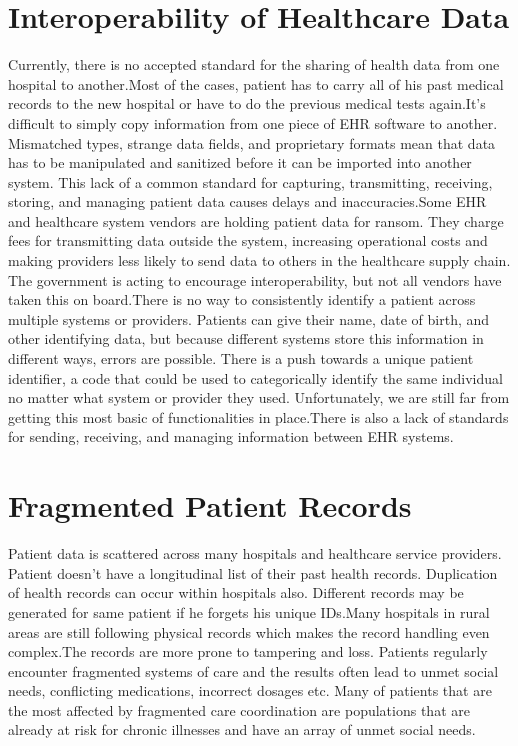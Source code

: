 \documentclass[12pt]{report}
\begin{document}
\section{Interoperability of Healthcare Data}
\frenchspacing
Currently, there is no accepted standard for the sharing of health data from one hospital to another.Most of the cases, patient has to carry all of his past medical records to the new hospital or have to do the previous medical tests again.It’s difficult to simply copy information from one piece of EHR software to another. Mismatched types, strange data fields, and proprietary formats mean that data has to be manipulated and sanitized before it can be imported into another system. This lack of a common standard for capturing, transmitting, receiving, storing, and managing patient data causes delays and inaccuracies.Some EHR and healthcare system vendors are holding patient data for ransom. They charge fees for transmitting data outside the system, increasing operational costs and making providers less likely to send data to others in the healthcare supply chain. The government is acting to encourage interoperability, but not all vendors have taken this on board.There is no way to consistently identify a patient across multiple systems or providers. Patients can give their name, date of birth, and other identifying data, but because different systems store this information in different ways, errors are possible. There is a push towards a unique patient identifier, a code that could be used to categorically identify the same individual no matter what system or provider they used. Unfortunately, we are still far from getting this most basic of functionalities in place.There is also a lack of standards for sending, receiving, and managing information between EHR systems.

\section{Fragmented Patient Records}
\par Patient data is scattered across many hospitals and healthcare service  providers. Patient doesn't have a longitudinal list of their past health records. Duplication of health records can occur within hospitals also. Different records may be generated for same patient if he forgets his unique IDs.Many hospitals in rural areas are still following physical records which makes the record handling even complex.The records are more prone to tampering and loss.
Patients regularly encounter fragmented systems of care and the results often lead to unmet social needs, conflicting medications, incorrect dosages etc. Many of patients that are the most affected by fragmented care coordination are populations that are already at risk for chronic illnesses and have an array of unmet social needs.
\end{document}
